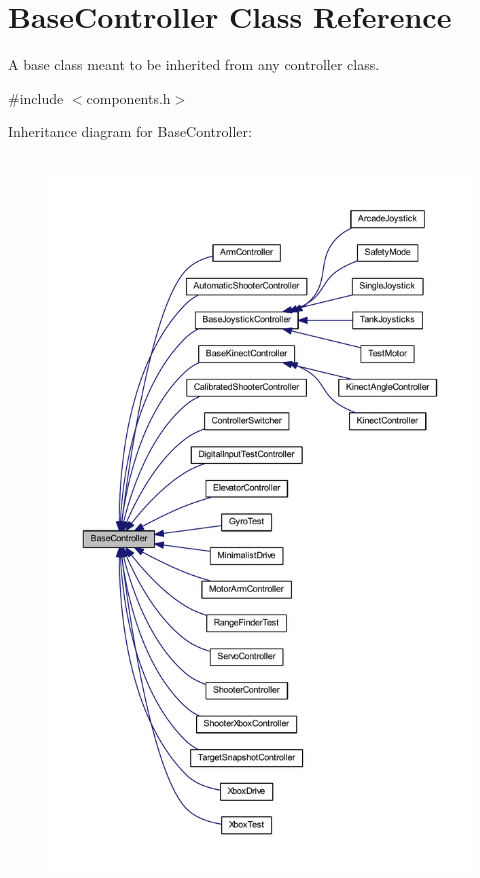 \hypertarget{class_base_controller}{\section{\-Base\-Controller \-Class \-Reference}
\label{class_base_controller}
}


\-A base class meant to be inherited from any controller class.  




{\ttfamily \#include $<$components.\-h$>$}



\-Inheritance diagram for \-Base\-Controller\-:\nopagebreak
\begin{figure}[H]
\begin{center}
\leavevmode
\includegraphics[height=550pt]{class_base_controller__inherit__graph}
\end{center}
\end{figure}
